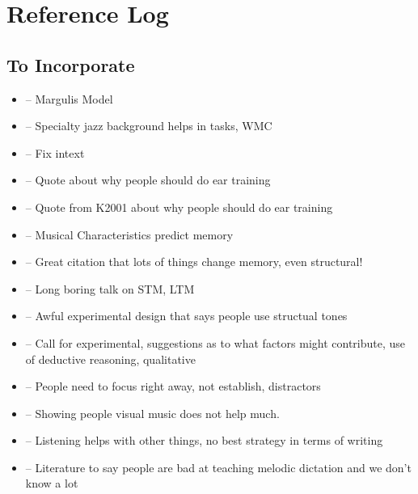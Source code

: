 \documentclass[]{book}
\theoremstyle{definition}
\theoremstyle{definition}
\theoremstyle{definition}
\theoremstyle{remark}
\begin{document}
\hypertarget{reference-log}{%
\chapter{Reference Log}\label{reference-log}}

\hypertarget{to-incorporate}{%
\section{To Incorporate}\label{to-incorporate}}

\begin{itemize}
\item
  \citep{margulisModelMelodicExpectation2005} -- Margulis Model
\item
  \citep{nicholsScoreOneJazz2018} -- Specialty jazz background helps in
  tasks, WMC
\item
  \citep{NASM201718HandbookPdf2018} -- Fix intext
\item
  \citep{schumann1860musikalische} -- Quote about why people should do
  ear training
\item
  \citep{smith1934solfege} -- Quote from K2001 about why people should
  do ear training
\item
  \citep{longRelationshipsPitchMemory1977} -- Musical Characteristics
  predict memory
\item
  \citep{taylorStrategiesMemoryShort1983} -- Great citation that lots of
  things change memory, even structural!
\item
  \citep{tallaricoStudyThreePhase1974} -- Long boring talk on STM, LTM
\item
  \citep{ouraConstructingRepresentationMelody1991a} -- Awful
  experimental design that says people use structual tones
\item
  \citep{buonviriExplorationUndergraduateMusic2014} -- Call for
  experimental, suggestions as to what factors might contribute, use of
  deductive reasoning, qualitative
\item
  \citep{buonviriEffectsPreparatorySinging2015} -- People need to focus
  right away, not establish, distractors
\item
  \citep{buonviriEffectsMusicNotation2015} -- Showing people visual
  music does not help much.
\item
  \citep{buonviriEffectsTwoListening2017} -- Listening helps with other
  things, no best strategy in terms of writing
\item
  \citep{buonviriMelodicDictationInstruction2015} -- Literature to say
  people are bad at teaching melodic dictation and we don't know a lot

\end{itemize}
\end{document}
